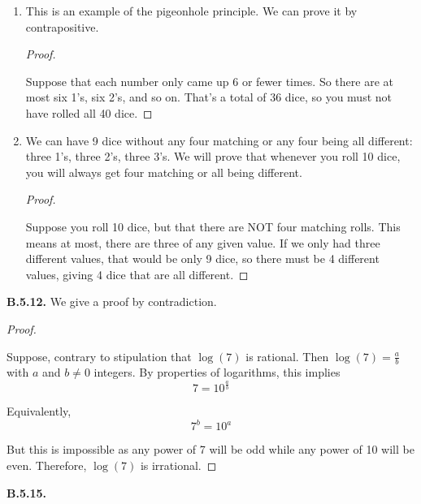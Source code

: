 \documentclass[10pt,]{book}
\theoremstyle{plain}
\theoremstyle{definition}
\theoremstyle{definition}
\theoremstyle{definition}
\theoremstyle{definition}
\numberwithin{equation}{chapter}
\begin{document}
\begin{enumerate}[label=(\alph*)]
\item\hypertarget{li-712}{}\hypertarget{p-2165}{}%
This is an example of the pigeonhole principle. We can prove it by contrapositive.%
\begin{proof}\hypertarget{proof-34}{}
\hypertarget{p-2166}{}%
Suppose that each number only came up 6 or fewer times. So there are at most six 1's, six 2's, and so on. That's a total of 36 dice, so you must not have rolled all 40 dice.%
\end{proof}
\item\hypertarget{li-713}{}\hypertarget{p-2167}{}%
We can have 9 dice without any four matching or any four being all different: three 1's, three 2's, three 3's. We will prove that whenever you roll 10 dice, you will always get four matching or all being different.%
\begin{proof}\hypertarget{proof-35}{}
\hypertarget{p-2168}{}%
Suppose you roll 10 dice, but that there are NOT four matching rolls. This means at most, there are three of any given value. If we only had three different values, that would be only 9 dice, so there must be 4 different values, giving 4 dice that are all different.%
\end{proof}
\end{enumerate}
%
\par\smallskip
\noindent\textbf{B.5.12.} \hypertarget{p-2170}{}%
We give a proof by contradiction.%
\begin{proof}\hypertarget{proof-36}{}
\hypertarget{p-2171}{}%
Suppose, contrary to stipulation that \(\log(7)\) is rational. Then \(\log(7) = \frac{a}{b}\) with \(a\) and \(b \ne 0\) integers. By properties of logarithms, this implies%
\begin{equation*}
7 = 10^{\frac{a}{b}}
\end{equation*}
%
\par
\hypertarget{p-2172}{}%
Equivalently,%
\begin{equation*}
7^b = 10^a
\end{equation*}
%
\par
\hypertarget{p-2173}{}%
But this is impossible as any power of 7 will be odd while any power of 10 will be even.  Therefore, \(\log(7)\) is irrational.%
\end{proof}
\par\smallskip
\noindent\textbf{B.5.15.} \hypertarget{p-2182}{}%
\leavevmode%
\end{document}

